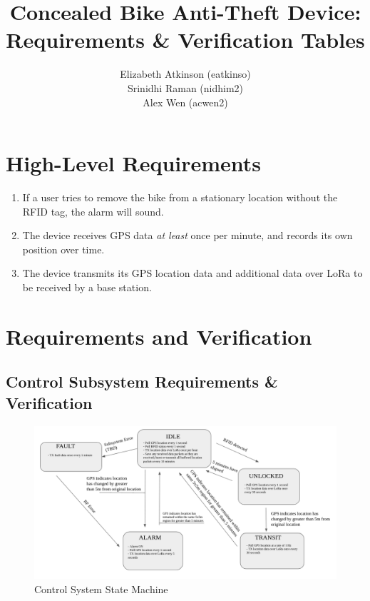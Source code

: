 \documentclass{article}
\begin{document}
	
	\begin{titlepage}
		\title{Concealed Bike Anti-Theft Device: Requirements \& Verification Tables}
		\author{Elizabeth Atkinson (eatkinso)\\ Srinidhi Raman (nidhim2) \\ Alex Wen (acwen2) }
	\end{titlepage}
	
	
	
	\maketitle{}
	
\section{High-Level Requirements}

\begin{enumerate}
	\item If a user tries to remove the bike from a stationary location without the RFID tag, the alarm will sound. 
	
	\item The device receives GPS data \textit{at least} once per minute, and records its own position over time.  
	
	\item The device transmits its GPS location data and additional data over LoRa to be received by a base station. 
	
\end{enumerate}

\section{Requirements and Verification}

\subsection{Control Subsystem Requirements \& Verification}

\begin{figure}[H]
	\begin{centering}
		\includegraphics[width=\textwidth]{state.png}
		\caption{Control System State Machine}\label{state}
	\end{centering}
\end{figure}
\end{document}
